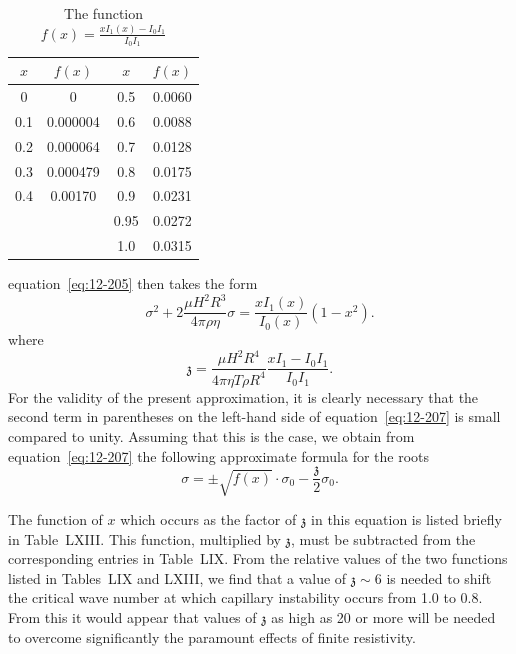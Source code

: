 \begin{table}[ht]
\centering
\caption{The function $f(x) = \frac{xI_1(x) - I_0 I_1}{I_0 I_1}$}
\label{tab:LXIII}
\begin{tabular}{cccc}
\hline
$x$ & $f(x)$ & $x$ & $f(x)$ \\
\hline
0 & 0 & 0.5 & 0.0060 \\
0.1 & 0.000004 & 0.6 & 0.0088 \\
0.2 & 0.000064 & 0.7 & 0.0128 \\
0.3 & 0.000479 & 0.8 & 0.0175 \\
0.4 & 0.00170 & 0.9 & 0.0231 \\
& & 0.95 & 0.0272 \\
& & 1.0 & 0.0315 \\
\hline
\end{tabular}
\end{table}

equation~\eqref{eq:12-205} then takes the form
\begin{equation}
\label{eq:12-207}
\sigma^2 + 2\frac{\mu H^2 R^3}{4\pi\rho\eta}\sigma = \frac{xI_1(x)}{I_0(x)}(1-x^2).
\end{equation}
where
\begin{equation}
\label{eq:12-208}
\mathfrak{z} = \frac{\mu H^2 R^4}{4\pi\eta T \rho R^4} \frac{xI_1-I_0 I_1}{I_0 I_1}.
\end{equation}
For the validity of the present approximation, it is clearly necessary that the second term in parentheses on the left-hand side of equation~\eqref{eq:12-207} is small compared to unity. Assuming that this is the case, we obtain from equation~\eqref{eq:12-207} the following approximate formula for the roots
\begin{equation}
\label{eq:12-209}
\sigma = \pm\sqrt{f(x)} \cdot \sigma_0 - \frac{\mathfrak{z}}{2}\sigma_0.
\end{equation}

The function of $x$ which occurs as the factor of $\mathfrak{z}$ in this equation is listed briefly in Table~LXIII. This function, multiplied by $\mathfrak{z}$, must be subtracted from the corresponding entries in Table~LIX. From the relative values of the two functions listed in Tables~LIX and LXIII, we find that a value of $\mathfrak{z} \sim 6$ is needed to shift the critical wave number at which capillary instability occurs from 1.0 to 0.8. From this it would appear that values of $\mathfrak{z}$ as high as 20 or more will be needed to overcome significantly the paramount effects of finite resistivity.

